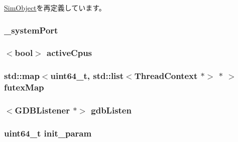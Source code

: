 \hyperlink{classSimObject_acaf6024ae9dda44bfb1c67e05ad70aef}{SimObject}を再定義しています。\hypertarget{classSystem_acc373b3a30590f0a6b23b470f85c07b0}{
\subsubsection[{\_\-systemPort}]{ {\bf \_\-systemPort}}}
\label{classSystem_acc373b3a30590f0a6b23b470f85c07b0}
\hypertarget{classSystem_adaa0501d61f40b707ee3add7379386fe}{
\subsubsection[{activeCpus}]{$<$bool$>$ {\bf activeCpus}}}
\label{classSystem_adaa0501d61f40b707ee3add7379386fe}
\hypertarget{classSystem_a0c17191d1d61a14d28a4d2ecd11beeff}{
\subsubsection[{futexMap}]{\setlength{\rightskip}{0pt plus 5cm}std::map$<$uint64\_\-t, {\bf std::list}$<${\bf ThreadContext} $\ast$$>$ $\ast$ $>$ {\bf futexMap}}}
\label{classSystem_a0c17191d1d61a14d28a4d2ecd11beeff}
\hypertarget{classSystem_a258d0d6139d48d76bf8bdda04f6e2ef8}{
\subsubsection[{gdbListen}]{$<${\bf GDBListener} $\ast$$>$ {\bf gdbListen}}}
\label{classSystem_a258d0d6139d48d76bf8bdda04f6e2ef8}
\hypertarget{classSystem_aebfcbf904f5dc098c119f45063661dce}{
\subsubsection[{init\_\-param}]{\setlength{\rightskip}{0pt plus 5cm}uint64\_\-t {\bf init\_\-param}}}
